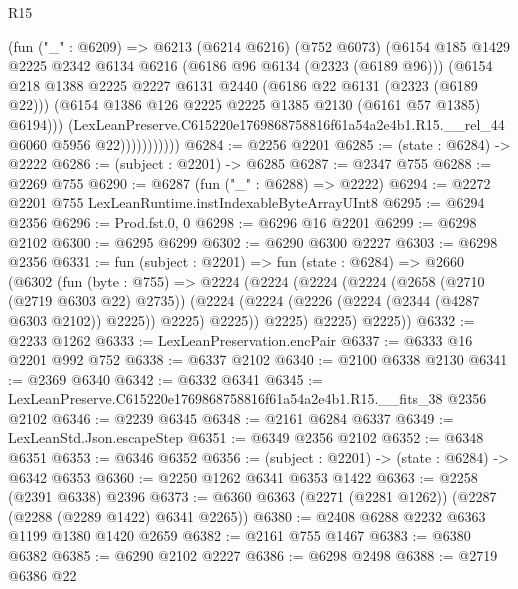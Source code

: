 \begin{lexlean}{R15}
\begin{coremodule}
                      (fun ("_" : @6209) =>
                      @6213
                        (@6214 @6216)
                        (@752 @6073)
                        (@6154
                          @185
                          @1429
                          @2225
                          @2342
                          @6134
                          @6216
                          (@6186 @96 @6134 (@2323 (@6189 @96)))
                          (@6154
                            @218
                            @1388
                            @2225
                            @2227
                            @6131
                            @2440
                            (@6186 @22 @6131 (@2323 (@6189 @22)))
                            (@6154 @1386 @126 @2225 @2225 @1385 @2130 (@6161 @57 @1385) @6194)))
                        (LexLeanPreserve.C615220e1769868758816f61a54a2e4b1.R15.__rel_44
                          @6060
                          @5956
                          @22)))))))))))
@6284 := @2256 @2201
@6285 := (state : @6284) -> @2222
@6286 := (subject : @2201) -> @6285
@6287 := @2347 @755
@6288 := @2269 @755
@6290 := @6287 (fun ("_" : @6288) => @2222)
@6294 := @2272 @2201 @755 LexLeanRuntime.instIndexableByteArrayUInt8
@6295 := @6294 @2356
@6296 := Prod.fst.{0, 0}
@6298 := @6296 @16 @2201
@6299 := @6298 @2102
@6300 := @6295 @6299
@6302 := @6290 @6300 @2227
@6303 := @6298 @2356
@6331 := fun (subject : @2201) =>
  fun (state : @6284) =>
  @2660
    (@6302
      (fun (byte : @755) =>
      @2224
        (@2224
          (@2224
            (@2224
              (@2658 (@2710 (@2719 @6303 @22) @2735))
              (@2224 (@2224 (@2226 (@2224 (@2344 (@4287 @6303 @2102)) @2225)) @2225) @2225))
            @2225)
          @2225)
        @2225))
@6332 := @2233 @1262
@6333 := LexLeanPreservation.encPair
@6337 := @6333 @16 @2201 @992 @752
@6338 := @6337 @2102
@6340 := @2100 @6338 @2130
@6341 := @2369 @6340
@6342 := @6332 @6341
@6345 := LexLeanPreserve.C615220e1769868758816f61a54a2e4b1.R15.__fits_38 @2356 @2102
@6346 := @2239 @6345
@6348 := @2161 @6284 @6337
@6349 := LexLeanStd.Json.escapeStep
@6351 := @6349 @2356 @2102
@6352 := @6348 @6351
@6353 := @6346 @6352
@6356 := (subject : @2201) -> (state : @6284) -> @6342 @6353
@6360 := @2250 @1262 @6341 @6353 @1422
@6363 := @2258 (@2391 @6338) @2396
@6373 := @6360 @6363 (@2271 (@2281 @1262)) (@2287 (@2288 (@2289 @1422) @6341 @2265))
@6380 := @2408 @6288 @2232 @6363 @1199 @1380 @1420 @2659
@6382 := @2161 @755 @1467
@6383 := @6380 @6382
@6385 := @6290 @2102 @2227
@6386 := @6298 @2498
@6388 := @2719 @6386 @22

\end{coremodule}
\end{lexlean}
